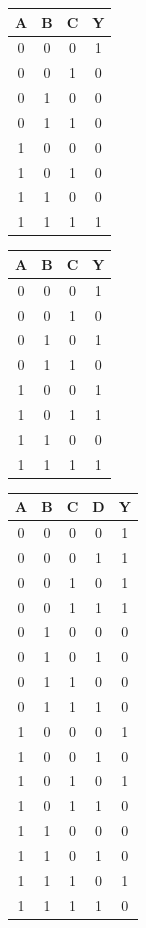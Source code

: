 \documentclass[12pt]{article}
\newenvironment{ex}[2][Exercise]{\begin{trivlist}
		\item[\hskip \labelsep {\bfseries #1}\hskip \labelsep {\bfseries #2.}]}{\end{trivlist}}
\begin{document}
\begin{ex}{2.1}
\begin{center}
\begin{enumerate*}[label=(\alph*)]
			\begin{tabular}{ccc|c}
				A & B & C & Y \\
				\hline
				0 & 0 & 0 & 1\\
				0 & 0 & 1 & 0\\
				0 & 1 & 0 & 0\\
				0 & 1 & 1 & 0\\
				1 & 0 & 0 & 0\\
				1 & 0 & 1 & 0\\
				1 & 1 & 0 & 0\\
				1 & 1 & 1 & 1\\
			\end{tabular}
			\item \begin{tabular}{ccc|c}
				A & B & C & Y \\
				\hline
				0 & 0 & 0 & 1\\
				0 & 0 & 1 & 0\\
				0 & 1 & 0 & 1\\
				0 & 1 & 1 & 0\\
				1 & 0 & 0 & 1\\
				1 & 0 & 1 & 1\\
				1 & 1 & 0 & 0\\
				1 & 1 & 1 & 1\\
			\end{tabular}
			\item \begin{tabular}{cccc|c}
				A & B & C & D & Y \\
				\hline
				0 & 0 & 0 & 0 & 1\\
				0 & 0 & 0 & 1 & 1\\
				0 & 0 & 1 & 0 & 1\\
				0 & 0 & 1 & 1 & 1\\
				0 & 1 & 0 & 0 & 0\\
				0 & 1 & 0 & 1 & 0\\
				0 & 1 & 1 & 0 & 0\\
				0 & 1 & 1 & 1 & 0\\
				1 & 0 & 0 & 0 & 1\\
				1 & 0 & 0 & 1 & 0\\
				1 & 0 & 1 & 0 & 1\\
				1 & 0 & 1 & 1 & 0\\
				1 & 1 & 0 & 0 & 0\\
				1 & 1 & 0 & 1 & 0\\
				1 & 1 & 1 & 0 & 1\\
				1 & 1 & 1 & 1 & 0\\
			\end{tabular}
			\item \
			

\end{enumerate*}
\end{center}
\end{ex}
\end{document}
